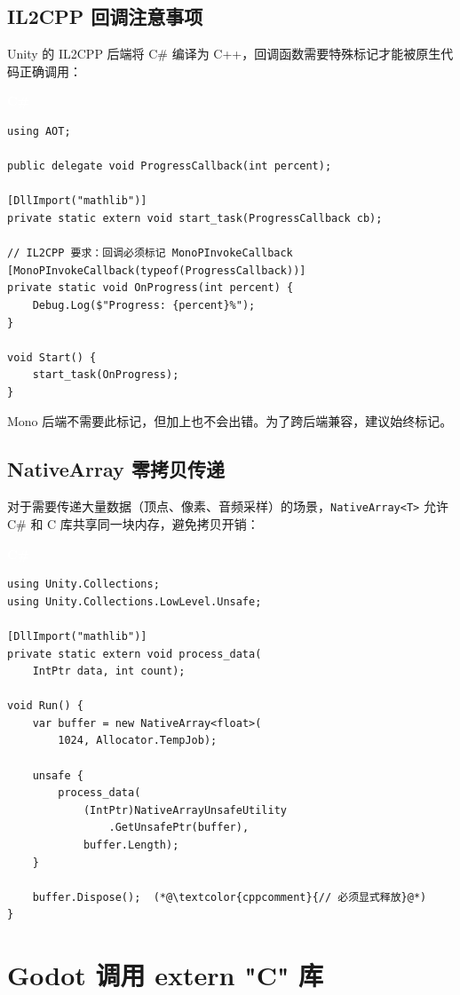 \documentclass[12pt,a4paper,fontset=fandol]{ctexbook}
\newcommand{\csharplabel}{%
  \begin{tcolorbox}[enhanced,colback=csharpheadbg,colframe=csharpheadbg,
    arc=1mm,boxrule=0mm,left=6pt,right=6pt,top=2pt,bottom=2pt,
    halign=left,oversize]
    \textcolor{white}{\small\bfseries C\#}
  \end{tcolorbox}\vspace{-4pt}}
\newcommand{\cpp}[1]{C++#1}
\newcommand{\Tp}[1]{\texttt{#1}}
\begin{document}
\subsection{IL2CPP 回调注意事项}

Unity 的 IL2CPP 后端将 C\# 编译为 \cpp{}，回调函数需要特殊标记才能被原生代码正确调用：

\csharplabel
\begin{lstlisting}[style=csharpstyle]
using AOT;

public delegate void ProgressCallback(int percent);

[DllImport("mathlib")]
private static extern void start_task(ProgressCallback cb);

// IL2CPP 要求：回调必须标记 MonoPInvokeCallback
[MonoPInvokeCallback(typeof(ProgressCallback))]
private static void OnProgress(int percent) {
    Debug.Log($"Progress: {percent}%");
}

void Start() {
    start_task(OnProgress);
}
\end{lstlisting}

Mono 后端不需要此标记，但加上也不会出错。为了跨后端兼容，建议始终标记。

\subsection{NativeArray 零拷贝传递}

对于需要传递大量数据（顶点、像素、音频采样）的场景，\Tp{NativeArray<T>} 允许 C\# 和 C 库共享同一块内存，避免拷贝开销：

\csharplabel
\begin{lstlisting}[style=csharpstyle]
using Unity.Collections;
using Unity.Collections.LowLevel.Unsafe;

[DllImport("mathlib")]
private static extern void process_data(
    IntPtr data, int count);

void Run() {
    var buffer = new NativeArray<float>(
        1024, Allocator.TempJob);

    unsafe {
        process_data(
            (IntPtr)NativeArrayUnsafeUtility
                .GetUnsafePtr(buffer),
            buffer.Length);
    }

    buffer.Dispose();  (*@\textcolor{cppcomment}{// 必须显式释放}@*)
}
\end{lstlisting}

\section{Godot 调用 extern "C" 库}
\end{document}
